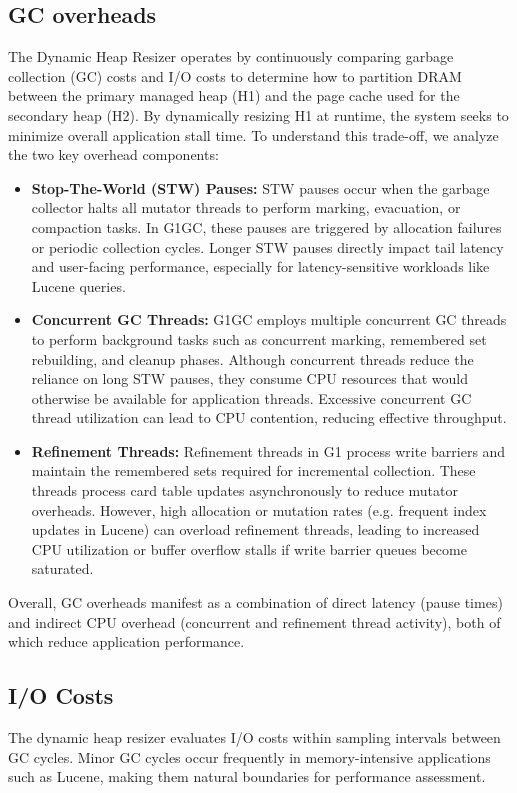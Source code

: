 \subsection{GC overheads}
The Dynamic Heap Resizer operates by continuously comparing garbage collection (GC) costs and I/O costs to determine how to partition DRAM between the primary managed heap (H1) and the page cache used for the secondary heap (H2). By dynamically resizing H1 at runtime, the system seeks to minimize overall application stall time. To understand this trade-off, we analyze the two key overhead components:
\begin{itemize}
\item \textbf{Stop-The-World (STW) Pauses:}
STW pauses occur when the garbage collector halts all mutator threads to perform marking, evacuation, or compaction tasks. In G1GC, these pauses are triggered by allocation failures or periodic collection cycles. Longer STW pauses directly impact tail latency and user-facing performance, especially for latency-sensitive workloads like Lucene queries.

\item \textbf{Concurrent GC Threads:}
G1GC employs multiple concurrent GC threads to perform background tasks such as concurrent marking, remembered set rebuilding, and cleanup phases. Although concurrent threads reduce the reliance on long STW pauses, they consume CPU resources that would otherwise be available for application threads. Excessive concurrent GC thread utilization can lead to CPU contention, reducing effective throughput.

\item \textbf{Refinement Threads:}
Refinement threads in G1 process write barriers and maintain the remembered sets required for incremental collection. These threads process card table updates asynchronously to reduce mutator overheads. However, high allocation or mutation rates (e.g. frequent index updates in Lucene) can overload refinement threads, leading to increased CPU utilization or buffer overflow stalls if write barrier queues become saturated.
\end{itemize}

Overall, GC overheads manifest as a combination of direct latency (pause times) and indirect CPU overhead (concurrent and refinement thread activity), both of which reduce application performance.

\subsection{I/O Costs}
The dynamic heap resizer evaluates I/O costs within sampling intervals between GC cycles. Minor GC cycles occur frequently in memory-intensive applications such as Lucene, making them natural boundaries for performance assessment.

